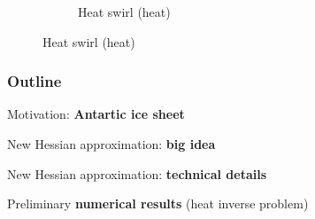 \documentclass[10pt,final,xcolor=dvipsnames]{beamer}
\begin{document}
\begin{frame}
\begin{figure}
\begin{subfigure}[b]{0.3\textwidth}
			\caption{Heat swirl (heat)}
		\end{subfigure}
	\end{figure}
\end{frame}
\begin{frame}
	\frametitle{Outline}
	{\Large
		\begin{itemize}
			\setlength\itemsep{2em}
			{\color{lightgray}\item Motivation: \textbf{Antartic ice sheet}}
			\item New Hessian approximation: \textbf{big idea}
			{\color{lightgray}\item New Hessian approximation: \textbf{technical details}}
			{\color{lightgray}\item Preliminary \textbf{numerical results} (heat inverse problem)}
		\end{itemize}
	}
\end{frame}
%
%
%
\end{document}
